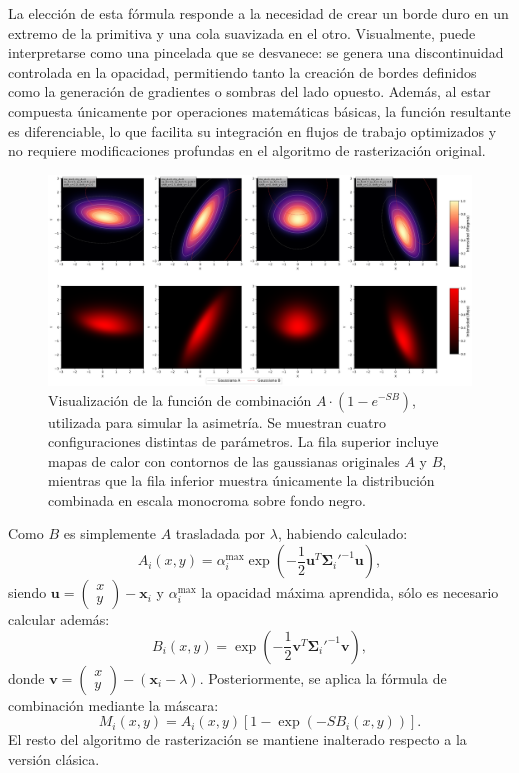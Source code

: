 La elección de esta fórmula responde a la necesidad de crear un borde duro en un extremo de la primitiva y una cola suavizada en el otro. Visualmente, puede interpretarse como una pincelada que se desvanece: se genera una discontinuidad controlada en la opacidad, permitiendo tanto la creación de bordes definidos como la generación de gradientes o sombras del lado opuesto. Además, al estar compuesta únicamente por operaciones matemáticas básicas, la función resultante es diferenciable, lo que facilita su integración en flujos de trabajo optimizados y no requiere modificaciones profundas en el algoritmo de rasterización original.

\begin{figure}[htbp]
    \centering
    \includegraphics[width=1\textwidth]{Graphics/splatts.png}
    \caption{Visualización de la función de combinación \(A \cdot (1 - e^{-S B})\), utilizada para simular la asimetría. Se muestran cuatro configuraciones distintas de parámetros. La fila superior incluye mapas de calor con contornos de las gaussianas originales \(A\) y \(B\), mientras que la fila inferior muestra únicamente la distribución combinada en escala monocroma sobre fondo negro.}
    \label{fig:gaussianas_2d_skewness}
\end{figure}

Como $B$ es simplemente $A$ trasladada por $\lambda$, habiendo calculado:
\[
A_i(x, y) = \alpha_i^{\max} \exp\left(-\frac{1}{2}\mathbf{u}^{T}\mathbf{\Sigma}_i'^{-1}\mathbf{u}\right),
\]
siendo $\mathbf{u} = \begin{pmatrix} x \\ y \end{pmatrix} - \mathbf{x}_i$ y $\alpha_i^{\max}$ la opacidad máxima aprendida, sólo es necesario calcular además:
\[
B_i(x, y) = \exp\left(-\frac{1}{2}\mathbf{v}^{T}\mathbf{\Sigma}_i'^{-1}\mathbf{v}\right),
\]
donde $\mathbf{v} = \begin{pmatrix} x \\ y \end{pmatrix} - (\mathbf{x}_i - \lambda)$.
Posteriormente, se aplica la fórmula de combinación mediante la máscara:
\[
M_i(x, y) = A_i(x, y)\left[1 - \exp\left(-S B_i(x, y)\right)\right].
\]
El resto del algoritmo de rasterización se mantiene inalterado respecto a la versión clásica.

